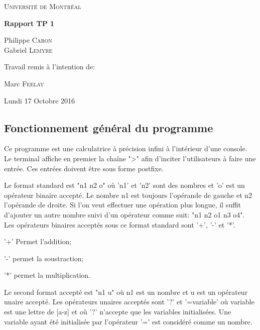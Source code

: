 \documentclass[]{report}
\begin{document}
	\begin{titlepage}
		\centering
		{\scshape\LARGE Université de Montréal \par}
		\vspace{1.5cm}
		{\huge\bfseries Rapport TP 1\par}
		\vspace{2cm}
		{\Large Philippe \textsc{Caron}\\Gabriel \textsc{Lemyre}\par}
		\vfill
		Travail remis à l'intention de:\par
		Marc \textsc{Feelay}	
		\vfill
		{\large Lundi 17 Octobre 2016\par}
	\end{titlepage}
	\newpage
	\begin{normalsize}
		\section*{\LARGE Fonctionnement général du programme}\vspace{4mm}
		Ce programme est une calculatrice à précision infini à l'intérieur d'une console. Le terminal affiche en premier la chaîne "\textgreater " afin d'inciter l'utilisateurs à faire une entrée. Ces entrées doivent être sous forme postfixe.
		\vspace{4mm}
		\par Le format standard est "n1 n2 o" où 'n1' et 'n2' sont des nombres et 'o' est un opérateur binaire accepté. Le nombre n1 est toujours l'opérande de gauche et n2 l'opérande de droite. Si l'on veut effectuer une opération plus longue, il suffit d'ajouter un autre nombre suivi d'un opérateur comme suit: "n1 n2 o1 n3 o4".
		Les opérateurs binaires acceptés sous ce format standard sont '+', '-' et '*'.
		\begin{description}[noitemsep]
			\item \hspace{4mm}'+' Permet l'addition;
			\item \hspace{4mm}'-' permet la soustraction;
			\item \hspace{4mm}'*' permet la multiplication.
		\end{description}
		\par Le second format accepté est "n1 u" où n1 est un nombre et u est un opérateur unaire accepté. Les opérateurs unaires acceptés sont '?' et '=variable' où variable est une lettre de [a-z] et où '?' n'accepte que les variables initialisées. Une variable ayant été initialisée par l'opérateur '=' est considéré comme un nombre.

\end{normalsize}
\end{document}
